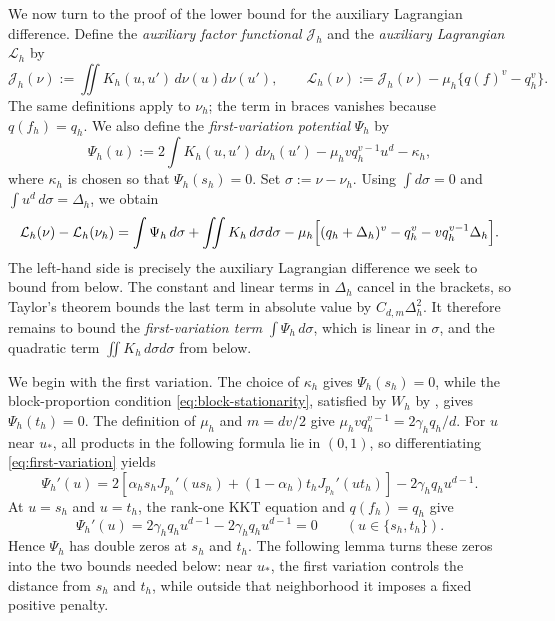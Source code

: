 We now turn to the proof of the lower bound for the auxiliary Lagrangian
difference.  Define the \emph{auxiliary factor functional} $\mathcal J_h$ and
the \emph{auxiliary Lagrangian} $\mathcal L_h$ by
\[
  \mathcal J_h(\nu)
  :=\iint K_h(u,u')\,d\nu(u)d\nu(u'),
  \qquad
  \mathcal L_h(\nu)
  :=\mathcal J_h(\nu)-\mu_h\{q(f)^v-q_h^v\}.
\]
The same definitions apply to $\nu_h$; the term in braces vanishes because
$q(f_h)=q_h$.
We also define the \emph{first-variation potential} $\Psi_h$ by
\begin{equation}\label{eq:first-variation}
  \Psi_h(u):=2\int K_h(u,u')\,d\nu_h(u')
  -\mu_hvq_h^{v-1}u^d-\kappa_h,
\end{equation}
where $\kappa_h$ is chosen so that $\Psi_h(s_h)=0$.
Set $\sigma:=\nu-\nu_h$.  Using $\int d\sigma=0$ and
$\int u^d\,d\sigma=\Delta_h$, we obtain
\begin{equation*}
  \mathcal L_h(\nu)-\mathcal L_h(\nu_h)
  =\int\Psi_h\,d\sigma+\iint K_h\,d\sigma d\sigma
    -\mu_h\Bigl[(q_h+\Delta_h)^v-q_h^v-vq_h^{v-1}\Delta_h\Bigr].
\end{equation*}
The left-hand side is precisely the auxiliary Lagrangian difference we seek
to bound from below.  The constant and linear terms in $\Delta_h$ cancel in
the brackets, so Taylor's theorem bounds the last term in absolute value by
$C_{d,m}\Delta_h^2$.
It therefore remains to bound the \emph{first-variation term} $\int\Psi_h\,d\sigma$,
which is linear in $\sigma$, and the quadratic term
$\iint K_h\,d\sigma d\sigma$ from below.

We begin with the first variation.  The choice of $\kappa_h$ gives
$\Psi_h(s_h)=0$, while the block-proportion condition
\eqref{eq:block-stationarity}, satisfied by $W_h$ by
, gives $\Psi_h(t_h)=0$.
The definition of $\mu_h$ and $m=dv/2$ give
$\mu_hvq_h^{v-1}=2\gamma_hq_h/d$.
For $u$ near $u_*$, all products in the following formula lie in $(0,1)$,
so differentiating \eqref{eq:first-variation} yields
\[
  \Psi_h'(u)
  =2\left[
    \alpha_hs_hJ_{p_h}'(us_h)
    +(1-\alpha_h)t_hJ_{p_h}'(ut_h)
  \right]-2\gamma_hq_hu^{d-1}.
\]
At $u=s_h$ and $u=t_h$, the rank-one KKT equation and
$q(f_h)=q_h$ give
\[
  \Psi_h'(u)
  =2\gamma_hq_hu^{d-1}-2\gamma_hq_hu^{d-1}
  =0 \qquad (u\in\{s_h,t_h\}).
\]
Hence $\Psi_h$ has double zeros at $s_h$ and $t_h$.
The following lemma turns these zeros into the two bounds needed below: near
$u_*$, the first variation controls the distance from $s_h$ and $t_h$, while
outside that neighborhood it imposes a fixed positive penalty.

